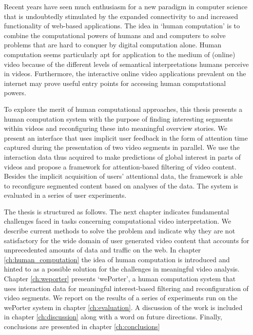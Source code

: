 Recent years have seen much enthusiasm for a new paradigm in computer science that is undoubtedly stimulated by the expanded connectivity to and increased functionality of web-based applications. The idea in `human computation' is to combine the computational powers of humans and and computers to solve problems that are hard to conquer by digital computation alone\cite{vonAhn:2005wi}. Human computation seems particularly apt for application to the medium of (online) video because of the different levels of semantical interpretations humans perceive in videos. Furthermore, the interactive online video applications prevalent on the internet may prove useful entry points for accessing human computational powers.

To explore the merit of human computational approaches, this thesis presents a human computation system with the purpose of finding interesting segments within videos and reconfiguring these into meaningful overview stories. We present an interface that uses implicit user feedback in the form of attention time captured during the presentation of two video segments in parallel. We use the interaction data thus acquired to make predictions of global interest in parts of videos and propose a framework for attention-based filtering of video content. Besides the implicit acquisition of users' attentional data, the framework is able to reconfigure segmented content based on analyses of the data. The system is evaluated in a series of user experiments.

The thesis is structured as follows. The next chapter indicates fundamental challenges faced in tasks concerning computational video interpretation. We describe current methods to solve the problem and indicate why they are not satisfactory for the wide domain of user generated video content that accounts for unprecedented amounts of data and traffic on the web. In chapter \ref{ch:human_computation} the idea of human computation is introduced and hinted to as a possible solution for the challenges in meaningful video analysis. Chapter \ref{ch:weporter} presents `wePorter', a human computation system that uses interaction data for meaningful interest-based filtering and reconfiguration of video segments. We report on the results of a series of experiments run on the wePorter system in chapter \ref{ch:evaluation}. A discussion of the work is included in chapter \ref{ch:discussion} along with a word on future directions. Finally, conclusions are presented in chapter \ref{ch:conclusions}


